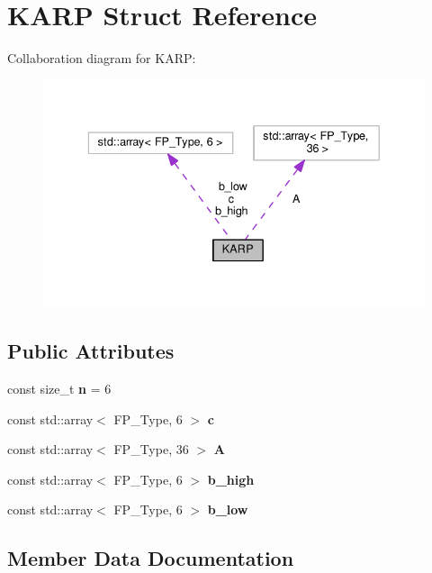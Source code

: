 \hypertarget{structKARP}{}\section{K\+A\+RP Struct Reference}
\label{structKARP}


Collaboration diagram for K\+A\+RP\+:\nopagebreak
\begin{figure}[H]
\begin{center}
\leavevmode
\includegraphics[width=336pt]{structKARP__coll__graph}
\end{center}
\end{figure}
\subsection*{Public Attributes}
\begin{DoxyCompactItemize}
\item 
\mbox{\label{structKARP_ae4748bfe9d63b1aaa28a8ea47072f8e3}} 
const size\+\_\+t {\bfseries n} = 6
\item 
const std\+::array$<$ F\+P\+\_\+\+Type, 6 $>$ {\bfseries c}
\item 
const std\+::array$<$ F\+P\+\_\+\+Type, 36 $>$ {\bfseries A}
\item 
const std\+::array$<$ F\+P\+\_\+\+Type, 6 $>$ {\bfseries b\+\_\+high}
\item 
const std\+::array$<$ F\+P\+\_\+\+Type, 6 $>$ {\bfseries b\+\_\+low}
\end{DoxyCompactItemize}


\subsection{Member Data Documentation}
\mbox{\label{structKARP_a5e62cee865e772c7a7e7072f578c658d}} 
